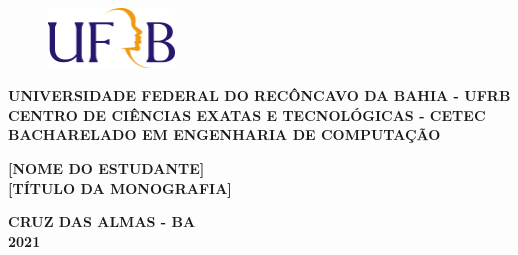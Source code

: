\begin{titlepage}
  \begin{figure}[htb]			
	  \centering
	  \includegraphics[width=0.3\textwidth]{figuras/ufrb.png}
  \end{figure}
  \begin{center}
    \textbf{UNIVERSIDADE FEDERAL DO RECÔNCAVO DA BAHIA - UFRB}\\
    \textbf{CENTRO DE CIÊNCIAS EXATAS E TECNOLÓGICAS - CETEC}\\
    \textbf{BACHARELADO EM ENGENHARIA DE COMPUTAÇÃO}\\

  \end{center}

 
\centering
	\begin{center}
	
		\vfill
		\textbf{[NOME DO ESTUDANTE]\\} 
\vfill
		\textbf{[TÍTULO DA MONOGRAFIA]}\\
		
		
		
		
	\end{center}
	 \vfill
		
			\textbf{CRUZ DAS ALMAS - BA \\2021}
\end{titlepage}

